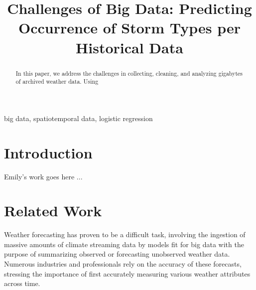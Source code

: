 \documentclass[conference]{IEEEtran}
\begin{document}
\title{Challenges of Big Data: Predicting Occurrence of Storm Types per Historical Data}
\author{
\and
{}
\and
{}
}

\maketitle

\begin{abstract}
In this paper, we address the challenges in collecting, cleaning, and analyzing gigabytes of archived weather data. Using 
\end{abstract}

\begin{IEEEkeywords}
big data, spatiotemporal data, logistic regression
\end{IEEEkeywords}

\section{Introduction}

Emily's work goes here ...

\section{Related Work}

Weather forecasting has proven to be a difficult task, involving the ingestion of massive amounts of climate streaming data by models fit for big data with the purpose of summarizing observed or forecasting unobserved weather data. Numerous industries and professionals rely on the accuracy of these forecasts, stressing the importance of first accurately measuring various weather attributes across time. 
\end{document}

